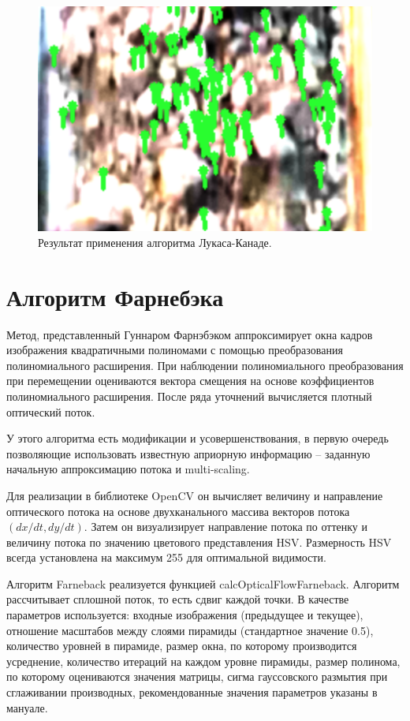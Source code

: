 \documentclass[times]{itmo-student-thesis}
\begin{document}
\begin{figure}[h!]
	\centering
	\includegraphics[width=0.7\linewidth]{images/lk}
	\caption{Результат применения алгоритма Лукаса-Канаде.}
	\label{fig:lk}
\end{figure}


\section{Алгоритм Фарнебэка}

Метод, представленный Гуннаром Фарнэбэком аппроксимирует окна кадров изображения квадратичными полиномами с помощью преобразования полиномиального расширения. При наблюдении полиномиального преобразования при перемещении  оцениваются вектора смещения на основе коэффициентов полиномиального расширения. После ряда уточнений вычисляется плотный оптический поток.

У этого алгоритма есть модификации и усовершенствования, в первую очередь позволяющие использовать известную априорную информацию – заданную начальную аппроксимацию потока и multi-scaling.

Для реализации в библиотеке OpenCV он вычисляет величину и направление оптического потока на основе двухканального массива векторов потока $(dx/dt, dy/dt)$. Затем он визуализирует направление потока по оттенку и величину потока по значению цветового представления HSV. Размерность HSV всегда установлена на максимум 255 для оптимальной видимости.

Алгоритм Farneback реализуется функцией calcOpticalFlowFarneback. Алгоритм рассчитывает сплошной поток, то есть сдвиг каждой точки. В качестве параметров используется: входные изображения (предыдущее и текущее), отношение масштабов между слоями пирамиды (стандартное значение 0.5), количество уровней в пирамиде,  размер окна, по которому производится усреднение,  количество итераций на каждом уровне пирамиды, размер полинома, по которому оцениваются значения матрицы, сигма гауссовского размытия при сглаживании производных, рекомендованные значения параметров указаны в мануале. 
\end{document}
